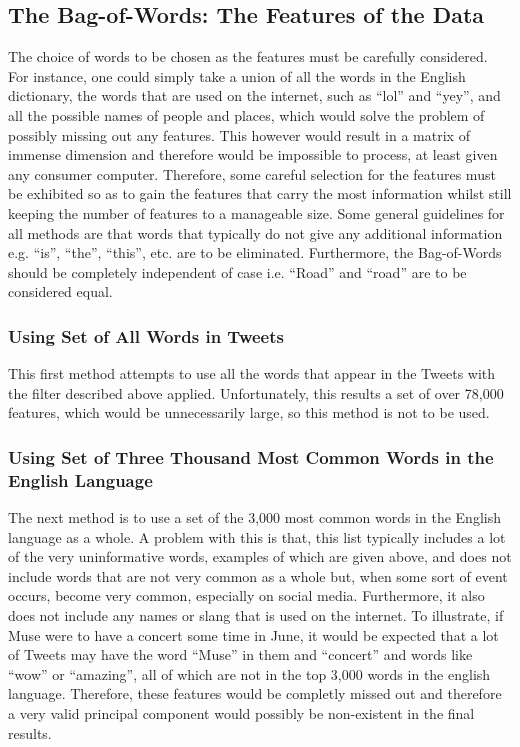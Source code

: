 \documentclass[11pt,a4paper]{article}
\begin{document}
\subsection{The Bag-of-Words: The Features of the Data}
The choice of words to be chosen as the features must be carefully considered. For instance, one could simply take a union of all the words in the English dictionary, the words that are used on the internet, such as ``lol'' and ``yey'', and all the possible names of people and places, which would solve the problem of possibly missing out any features. This however would result in a matrix of immense dimension and therefore would be impossible to process, at least given any consumer computer. Therefore, some careful selection for the features must be exhibited so as to gain the features that carry the most information whilst still keeping the number of features to a manageable size. Some general guidelines for all methods are that words that typically do not give any additional information e.g. ``is'', ``the'', ``this'', etc. are to be eliminated. Furthermore, the Bag-of-Words should be completely independent of case i.e. ``Road'' and ``road'' are to be considered equal. 

\subsubsection{Using Set of All Words in Tweets}
This first method attempts to use all the words that appear in the Tweets with the filter described above applied. Unfortunately, this results a set of over 78,000 features, which would be unnecessarily large, so this method is not to be used. 

\subsubsection{Using Set of Three Thousand Most Common Words in the English Language}
The next method is to use a set of the 3,000 most common words in the English language as a whole. A problem with this is that, this list typically includes a lot of the very uninformative words, examples of which are given above, and does not include words that are not very common as a whole but, when some sort of event occurs, become very common, especially on social media. Furthermore, it also does not include any names or slang that is used on the internet. To illustrate, if Muse were to have a concert some time in June, it would be expected that a lot of Tweets may have the word ``Muse'' in them and ``concert'' and words like ``wow'' or ``amazing'', all of which are not in the top 3,000 words in the english language. Therefore, these features would be completly missed out and therefore a very valid principal component would possibly be non-existent in the final results.
\end{document}
